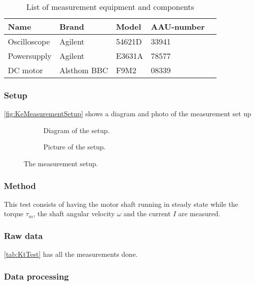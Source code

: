 \begin{table}[htbp]
	\centering
	\caption{List of measurement equipment and components}\label{tab_appendix:BmSetUp}
	
	\begin{tabularx}{\textwidth}{lXXXX}
		Name 				& Brand	& Model & AAU-number									\\ \toprule \rowcolor{lightGrey}
		Oscilloscope	& Agilent & 54621D & 33941 	\\
		Powersupply	& Agilent & E3631A & 78577\\ \rowcolor{lightGrey}
		DC motor & Alsthom BBC & F9M2& 08339
	\end{tabularx}
\end{table}

\subsubsection*{Setup}
\autoref{fig:KeMeasurementSetup} shows a diagram and photo of the measurement set up
\begin{figure}[htbp]
	\centering
	\begin{subfigure}{0.50\textwidth}
		\caption{Diagram of the setup.} \label{fig:BmMeasurementDiagram}
	\end{subfigure}
	\begin{subfigure}{0.40\textwidth}
		\caption{Picture of the setup.} \label{fig:BmMeasurementPictures}
	\end{subfigure}
	\caption{The measurement setup.} \label{fig:BmMeasurementSetup}   
\end{figure}

\subsubsection*{Method}
This test consists of having the motor shaft running in steady state while the torque $\tau_m$, the shaft angular velocity $\omega$ and the current $I$ are measured.

\subsubsection*{Raw data}
\autoref{tab:KtTest} has all the measurements done.


\subsubsection*{Data processing}


